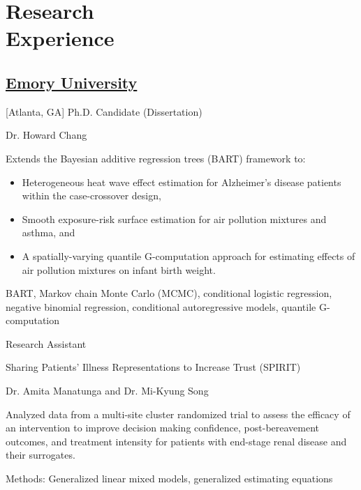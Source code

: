 \section{Research \\ Experience}

\subsection{\href{https://www.emory.edu/home/index.html}{Emory University}}[Atlanta, GA]
\vspace{-\parskip}
Ph.D. Candidate (Dissertation) \hfill {} \\
    \begin{description}[leftmargin=!,labelwidth=1.0em,labelindent=1.0em]
    \item[Advisor:] Dr. Howard Chang
    \item[Description:] Extends the Bayesian additive regression trees (BART) framework to:
    \begin{itemize}
        \item Heterogeneous heat wave effect estimation for Alzheimer's disease patients within the case-crossover design,
        \item Smooth exposure-risk surface estimation for air pollution mixtures and asthma, and
        \item A spatially-varying quantile G-computation approach for estimating effects of air pollution mixtures on infant birth weight.
    \end{itemize}
    \item[Methods:] BART, Markov chain Monte Carlo (MCMC), conditional logistic regression, negative binomial regression, conditional autoregressive models, quantile G-computation
    \end{description}

Research Assistant \hfill {} \\
    \begin{description}[leftmargin=!,labelwidth=1.0em,labelindent=1.0em]
    \item[Title:] Sharing Patients' Illness Representations to Increase Trust (SPIRIT)
    \item[Advisors:] Dr. Amita Manatunga and Dr. Mi-Kyung Song
    \item[Description:] Analyzed data from a multi-site cluster randomized trial to assess the efficacy of an intervention to improve decision making confidence, post-bereavement outcomes, and treatment intensity for patients with end-stage renal disease and their surrogates. 
    \end{description}
    \vspace{-\parskip}
    \indent \quad Methods: Generalized linear mixed models, generalized estimating equations


